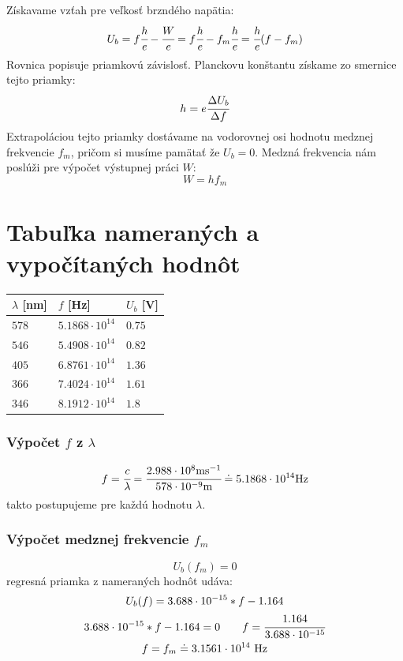 \documentclass[12pt,a4paper,final]{report}
\begin{document}
Získavame vzťah pre veľkosť brzndého napätia:
\begin{equation}
	U_b=f\cfrac{h}{e}-\cfrac{W}{e}=f\cfrac{h}{e}-f_m\cfrac{h}{e}=\cfrac{h}{e}(f-f_m)
\end{equation}
Rovnica popisuje priamkovú závislosť. Planckovu konštantu získame zo smernice
tejto priamky:
\begin{equation}
	h=e\cfrac{\Delta U_b}{\Delta f}
\end{equation}
Extrapoláciou tejto priamky dostávame na vodorovnej osi hodnotu medznej frekvencie $f_m$, pričom si musíme pamätať že $U_b=0$. Medzná frekvencia nám poslúži pre výpočet výstupnej práci $W$:
\begin{equation}
	W=hf_m
\end{equation}

\section*{Tabuľka nameraných a vypočítaných hodnôt}

\begin{table}[h]
\centering
\begin{tabular}{|l|l|l|}
\hline
$\lambda$ [nm] & $f$ [Hz] & $U_b$ [V] \\ \hline
$578$ & $5.1868\cdot 10^{14}$ & $0.75$ \\ \hline
$546$ & $5.4908\cdot 10^{14}$ & $0.82$ \\ \hline
$405$ & $6.8761\cdot 10^{14}$ & $1.36$ \\ \hline
$366$ & $7.4024\cdot 10^{14}$ & $1.61$ \\ \hline
$346$ & $8.1912\cdot 10^{14}$ & $1.8$ \\ \hline
\end{tabular}
\end{table}

\subsubsection{Výpočet $f$ z $\lambda$}
\begin{equation}
	f=\cfrac{c}{\lambda}=\cfrac{2.988\cdot10^8\text{ms$^{-1}$}}{578\cdot10^{-9}\text{m}}\doteq5.1868\cdot 10^{14}\text{Hz}
\end{equation} takto postupujeme pre každú hodnotu $\lambda$.

\subsubsection{Výpočet medznej frekvencie $f_m$}
\begin{equation}
	U_b(f_m)=0
\end{equation} regresná priamka z nameraných hodnôt udáva:
\begin{equation}
	\begin{gathered}
		U_b(f)=3.688\cdot10^{-15} * f - 1.164 \\
		3.688\cdot10^{-15} * f - 1.164 = 0 \qquad f = \cfrac{1.164}{3.688\cdot10^{-15}} \\
		f = f_m \doteq 3.1561\cdot10^{14}\text{ Hz}
	\end{gathered}
\end{equation}
\end{document}
